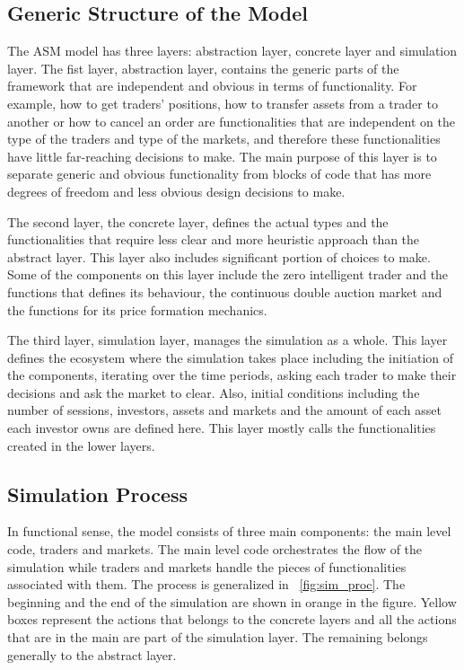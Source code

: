 \subsection{Generic Structure of the Model}
The ASM model has three layers: abstraction layer, concrete 
layer and simulation layer. The fist layer, abstraction layer, contains the 
generic parts of the framework that are independent and obvious in terms
of functionality. For example, how to get traders' positions, how to
transfer assets from a trader to another or how to cancel an order are
functionalities that are independent on the type of the traders 
and type of the markets, and therefore these functionalities have little
far-reaching decisions to make. The main purpose of this layer
is to separate generic and obvious functionality from blocks of code
that has more degrees of freedom and less obvious design decisions to make.

The second layer, the concrete layer, defines the actual types and the
functionalities that require less clear and more heuristic
approach than the abstract layer. This layer also includes significant
portion of choices to make. Some of the components
on this layer include the zero intelligent trader and the
functions that defines its behaviour, the continuous double auction
market and the functions for its price formation mechanics.

The third layer, simulation layer, manages the simulation as a whole.
This layer defines the ecosystem where the simulation takes place including
the initiation of the components, iterating over the time periods, asking
each trader to make their decisions and ask the market to clear. 
Also, initial conditions including the number of sessions, investors, assets and markets
and the amount of each asset each investor owns are defined here. 
This layer mostly calls the functionalities created in the lower layers.



\subsection{Simulation Process}
In functional sense, the model consists of three main components:
the main level code, traders and markets. The main level code 
orchestrates the flow of the simulation while traders and markets
handle the pieces of functionalities associated with them. The process
is generalized in ~\ref{fig:sim_proc}. The beginning and the end of the 
simulation are shown in orange in the figure. Yellow boxes represent
the actions that belongs to the concrete layers and all the actions that
are in the main are part of the simulation layer. The remaining belongs
generally to the abstract layer.


